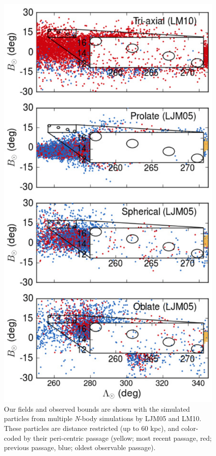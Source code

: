 \documentclass[preprint2]{aastex}
\begin{document}
	\begin{figure}[t!]
		\includegraphics[width=\columnwidth]{./law_spatial.eps}
		\caption{Our fields and observed bounds are shown with the simulated particles from multiple \textit{N}-body simulations by LJM05 and LM10. These particles are distance restricted (up to 60 kpc), and color-coded by their peri-centric passage (yellow; most recent passage, red; previous passage, blue; oldest observable passage).}
		\label{fig:law-spatial}
	\end{figure}
\end{document}
